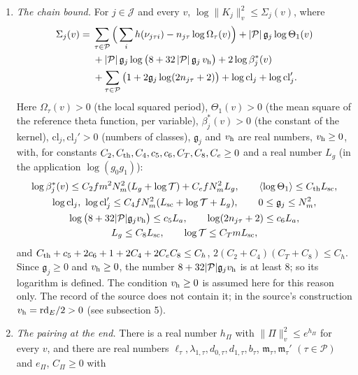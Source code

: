 \documentclass[11pt,letterpaper]{article}
\begin{document}
\begin{enumerate}[label=\textup{(S\arabic*)},leftmargin=2.8em,itemsep=3pt,topsep=3pt]
\item \emph{The chain bound.} For $j\in\mathcal J$ and every $v$, $\log\|K_j\|_v^2\le\Sigma_j(v)$, where
\begin{align}\label{D:253}
 \Sigma_j(v)={}&\sum_{\tau\in\mathcal P}\Big(\sum_ih(\nu_{j\tau i})-n_{j\tau}\log\Omega_\tau(v)\Big)
   +|\mathcal P|\,\mathfrak g_j\log\Theta_1(v)\\
  &+|\mathcal P|\,\mathfrak g_j\log\big(8+32\,|\mathcal P|\,\mathfrak g_j\,v_{\rm h}\big)
   +2\log\beta^{*}_j(v)\\
  &+\sum_{\tau\in\mathcal P}\big(1+2\mathfrak g_j\log(2n_{j\tau}+2)\big)+\log\mathrm{cl}_j+\log\mathrm{cl}_j' .
\end{align}
Here $\Omega_\tau(v)>0$ (the local squared period), $\Theta_1(v)>0$ (the mean square of the reference
theta function, per variable), $\beta^{*}_j(v)>0$ (the constant of the kernel),
$\mathrm{cl}_j,\mathrm{cl}_j'>0$ (numbers of classes), $\mathfrak g_j$ and $v_{\rm h}$ are real numbers, $v_{\rm h}\ge0$,
with, for constants $C_2,C_{\rm th},C_4,c_5,c_6,C_T,C_8,C_e\ge0$ and a real number $L_g$ (in the
application $\log(g_0g_1)$):
\begin{gather}\label{D:254}
 \log\beta^{*}_j(v)\le C_2fm^2N_m^2(L_g+\log\mathcal T)+C_efN_m^2L_g,\qquad
 \langle\log\Theta_1\rangle\le C_{\rm th}L_{\rm sc},\\
 \log\mathrm{cl}_j,\ \log\mathrm{cl}_j'\le C_4fN_m^2(L_{\rm sc}+\log\mathcal T+L_g),\qquad
 0\le\mathfrak g_j\le N_m^2,\\
 \log\big(8+32|\mathcal P|\mathfrak g_jv_{\rm h}\big)\le c_5L_a,\qquad\log(2n_{j\tau}+2)\le c_6L_a,\\
 L_g\le C_8L_{\rm sc},\qquad\log\mathcal T\le C_TmL_{\rm sc},
\end{gather}
and $C_{\rm th}+c_5+2c_6+1+2C_4+2C_eC_8\le C_h$, $2(C_2+C_4)(C_T+C_8)\le C_h$. Since
$\mathfrak g_j\ge0$ and $v_{\rm h}\ge0$, the number $8+32|\mathcal P|\mathfrak g_jv_{\rm h}$ is at least
$8$; so its logarithm is defined. The condition $v_{\rm h}\ge0$ is assumed here for this reason only. The
record of the source does not contain it; in the source's construction $v_{\rm h}=\mathrm{rd}_E/2>0$
(see subsection 5).
\item \emph{The pairing at the end.} There is a real number $h_\Pi$ with $\|\Pi\|_v^2\le e^{h_\Pi}$ for
every $v$, and there are real numbers $\ell_\tau,\lambda_{1,\tau},d_{0,\tau},d_{1,\tau},b_\tau$,
$\mathfrak m_\tau,\mathfrak m_\tau'$ $(\tau\in\mathcal P)$ and $e_\Pi$, $C_\Pi\ge0$ with

\end{enumerate}
\end{document}
